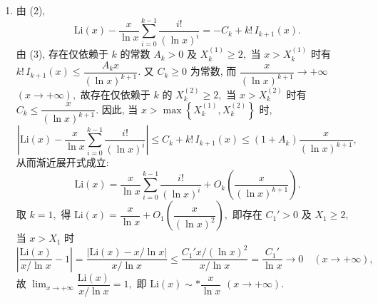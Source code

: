 \begin{solution}
\begin{enumerate}
对第二段, 由 $\ln t \ge \dfrac{\ln x}{2}$ ($t \in [\sqrt{x}, x]$), 有
\begin{equation*}
\int_{\sqrt{x}}^{x} \frac{\mathrm{d}t}{(\ln t)^{k+1}} \le \frac{x}{\bigl(\frac{\ln x}{2}\bigr)^{k+1}} = \frac{2^{k+1} x}{(\ln x)^{k+1}}.
\end{equation*}
综合两段, 当 $x > X_k$ 时, $I_{k+1}(x) \le \dfrac{(2^{k+1}+1)\,x}{(\ln x)^{k+1}},$ 即 $I_{k+1}(x) = O_k\!\left(\dfrac{x}{(\ln x)^{k+1}}\right).$

\item 由 (2),
\begin{equation*}
\mathrm{Li}(x) - \frac{x}{\ln x} \sum_{i=0}^{k-1} \frac{i!}{(\ln x)^i} = -C_k + k! \, I_{k+1}(x).
\end{equation*}
由 (3), 存在仅依赖于 $k$ 的常数 $A_k > 0$ 及 $X_k^{(1)} \ge 2,$ 当 $x > X_k^{(1)}$ 时有 $k! \, I_{k+1}(x) \le \dfrac{A_k x}{(\ln x)^{k+1}}.$ 又 $C_k \ge 0$ 为常数, 而 $\dfrac{x}{(\ln x)^{k+1}} \to +\infty$ $(x \to +\infty),$ 故存在仅依赖于 $k$ 的 $X_k^{(2)} \ge 2,$ 当 $x > X_k^{(2)}$ 时有 $C_k \le \dfrac{x}{(\ln x)^{k+1}}.$ 因此, 当 $x > \max\!\left\{ X_k^{(1)}, X_k^{(2)} \right\}$ 时,
\begin{equation*}
\left| \mathrm{Li}(x) - \frac{x}{\ln x} \sum_{i=0}^{k-1} \frac{i!}{(\ln x)^i} \right| \le C_k + k! \, I_{k+1}(x) \le (1 + A_k) \frac{x}{(\ln x)^{k+1}},
\end{equation*}
从而渐近展开式成立:
\begin{equation*}
\mathrm{Li}(x) = \frac{x}{\ln x} \sum_{i=0}^{k-1} \frac{i!}{(\ln x)^i} + O_k\!\left(\frac{x}{(\ln x)^{k+1}}\right).
\end{equation*}
取 $k = 1,$ 得 $\mathrm{Li}(x) = \dfrac{x}{\ln x} + O_1\!\left(\dfrac{x}{(\ln x)^2}\right),$ 即存在 $C_1' > 0$ 及 $X_1 \ge 2,$ 当 $x > X_1$ 时
\begin{equation*}
\left| \frac{\mathrm{Li}(x)}{x/\ln x} - 1 \right| = \frac{\bigl|\mathrm{Li}(x) - x/\ln x\bigr|}{x/\ln x} \le \frac{C_1' x / (\ln x)^2}{x / \ln x} = \frac{C_1'}{\ln x} \to 0 \quad (x \to +\infty),
\end{equation*}
故 $\displaystyle\lim_{x \to +\infty} \dfrac{\mathrm{Li}(x)}{x/\ln x} = 1,$ 即 $\mathrm{Li}(x) \sim* \dfrac{x}{\ln x}$ $(x \to +\infty).$
\end{enumerate}
\end{solution}



